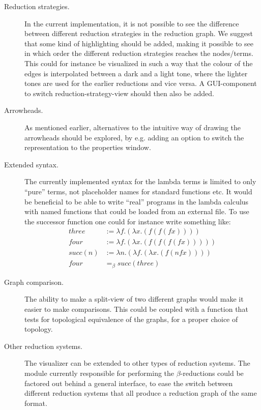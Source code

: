 \begin{description}
	\item[Reduction strategies.] In the current implementation, it is not possible
	to see the difference between different reduction strategies in the reduction graph.
	We suggest that some kind of highlighting should be added, making it possible to
	see in which order the different reduction strategies reaches the nodes/terms. 
	This could for instance be visualized in such a way that the colour of the edges
	is interpolated between a dark and a light tone, where the lighter tones are used for
	the earlier reductions and vice versa. A GUI-component to switch reduction-strategy-view
	should then also be added.
	
	\item[Arrowheads.] As mentioned earlier, alternatives to the intuitive way 
	of drawing the arrowheads should be explored, by e.g. adding an option to
	switch the representation to the properties window.
	
	\item[Extended syntax.] The currently implemented syntax for the lambda terms
	is limited to only ``pure'' terms, not placeholder names for standard functions etc.
	It would be beneficial to be able to write ``real'' programs in the lambda 
	calculus with named functions that could be loaded from an external file.
	To use the successor function one could for instance write something like:
	\begin{align*}
		three &:= \lambda f.(\lambda x.(f (f (f x)))) \\
		four &:= \lambda f.(\lambda x.(f (f (f (f x))))) \\
		succ(n) &:= \lambda n.(\lambda f.(\lambda x.(f (n f x)))) \\
		four &=_\beta succ(three)
	\end{align*}
	
	\item[Graph comparison.] The ability to make a split-view of two different graphs
	would make it easier to make comparisons. This could be coupled with a function
	that tests for topological equivalence of the graphs, for a proper choice of topology.
	
	
	\item[Other reduction systems.] The visualizer can be extended to other types
	of reduction systems. The module currently responsible for performing the $\beta$-reductions
	could be factored out behind a general interface, to ease the switch between different
	reduction systems that all produce a reduction graph of the same format.
	

\end{description}
